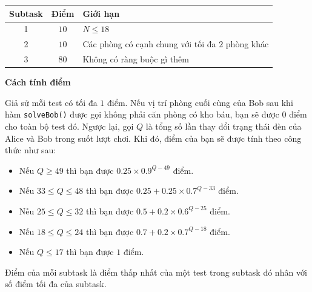 \begin{center}
  \begin{tabular}{|c|c|l|} \hline
    \textbf{Subtask} & \textbf{Điểm} & \textbf{Giới hạn} \\ \hline
    1 & $10$ & $N \le 18$ \\ \hline
    2 & $10$ & Các phòng có cạnh chung với tối đa $2$ phòng khác \\ \hline
    3 & $80$ & Không có ràng buộc gì thêm \\ \hline
  \end{tabular}
\end{center}

\textbf{Cách tính điểm}

Giả sử mỗi test có tối đa $1$ điểm. Nếu vị trí phòng cuối cùng của Bob sau khi hàm \texttt{solveBob()} được gọi không phải căn phòng có kho báu, bạn sẽ được $0$ điểm cho toàn bộ test đó. Ngược lại, gọi $Q$ là tổng số lần thay đổi trạng thái đèn của Alice và Bob trong suốt lượt chơi. Khi đó, điểm của bạn sẽ được tính theo công thức như sau:
\begin{itemize}
   \item Nếu $Q\ge 49$ thì bạn được $0.25\times 0.9^{Q-49}$ điểm.
   \item Nếu $33\le Q\le 48$ thì bạn được $0.25+0.25 \times 0.7^{Q-33}$ điểm.
   \item Nếu $25\le Q\le 32$ thì bạn được $0.5 + 0.2 \times 0.6^{Q-25}$ điểm.
   \item Nếu $18\le Q\le 24$ thì bạn được $0.7 + 0.2 \times 0.7^{Q-18}$ điểm.
   \item Nếu $Q\le 17$ thì bạn được $1$ điểm.
\end{itemize}

Điểm của mỗi subtask là điểm thấp nhất của một test trong subtask đó nhân với số điểm tối đa của subtask.